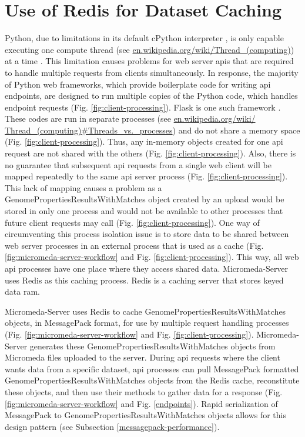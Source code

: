\section{Use of Redis for Dataset Caching} \label{redis-caching}

Python, due to limitations in its default cPython interpreter 
\cite{van1995python}, is only capable executing one compute thread 
\cite{saltzer1966traffic} (see 
\href{http://en.wikipedia.org/wiki/Thread_(computing)}{en.wikipedia.org/wiki/Thread\_(computing)}) 
at a time \cite{beazley2010understanding}. This limitation causes problems for 
web server \gls{api}s that are required to handle multiple requests from clients 
simultaneously. In response, the majority of Python web frameworks, which 
provide boilerplate code for writing \gls{api} endpoints, are designed to run 
multiple copies of the Python code, which handles endpoint requests (Fig. 
\ref{fig:client-processing}). Flask is one such framework 
\cite{grinberg2018flask}. These codes are run in separate processes (see 
\href{http://en.wikipedia.org/wiki/Thread_(computing)\#Threads\_vs.\_processes}{en.wikipedia.org/wiki/ 
Thread\_(computing)\#Threads\_vs.\_processes}) and do not share a memory space 
(Fig. \ref{fig:client-processing}). Thus, any in-memory objects created for one 
\gls{api} request are not shared with the others (Fig. 
\ref{fig:client-processing}). Also, there is no guarantee that subsequent 
\gls{api} requests from a single web client will be mapped repeatedly to the 
same \gls{api} server process (Fig. \ref{fig:client-processing}). This lack of 
mapping causes a problem as a GenomePropertiesResultsWithMatches object created 
by an upload would be stored in only one process and would not be available to 
other processes that future client requests may call (Fig. 
\ref{fig:client-processing}). One way of circumventing this process isolation 
issue is to store data to be shared between web server processes in an external 
process that is used as a cache (Fig. \ref{fig:micromeda-server-workflow} and 
Fig. \ref{fig:client-processing}). This way, all web \gls{api} processes have 
one place where they access shared data. Micromeda-Server uses Redis as this 
caching process. Redis is a caching server that stores keyed data \gls{ram}. 

Micromeda-Server uses Redis to cache GenomePropertiesResultsWithMatches objects, 
in MessagePack format, for use by multiple request handling processes (Fig. 
\ref{fig:micromeda-server-workflow} and Fig. \ref{fig:client-processing}). 
Micromeda-Server generates these GenomePropertiesResultsWithMatches objects from 
Micromeda files uploaded to the server. During \gls{api} requests where the 
client wants data from a specific dataset, \gls{api} processes can pull 
MessagePack formatted GenomePropertiesResultsWithMatches objects from the Redis 
cache, reconstitute these objects, and then use their methods to gather data for 
a response (Fig. \ref{fig:micromeda-server-workflow} and Fig. \ref{endpoints}). 
Rapid serialization of MessagePack to GenomePropertiesResultsWithMatches objects 
allows for this design pattern (see Subsection \ref{messagepack-performance}).


